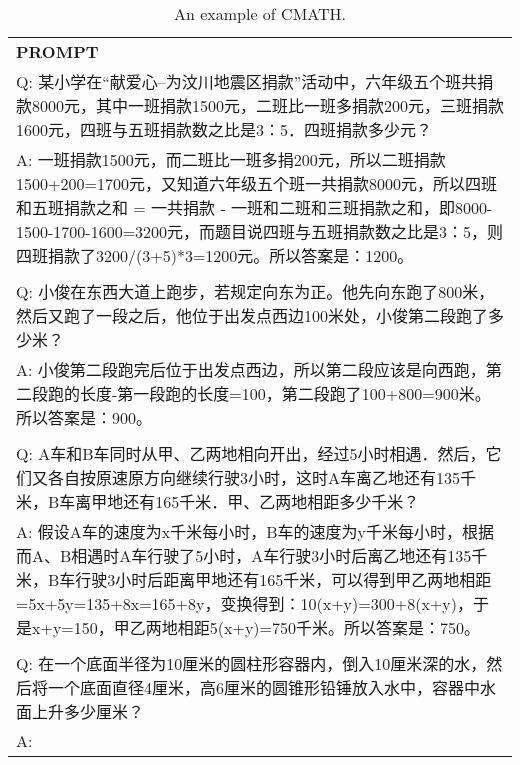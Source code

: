 \begin{table}[ht]
    \centering \small
\begin{tabular}{p{12cm}}
\toprule
\textbf{PROMPT}\\
Q: 某小学在“献爱心--为汶川地震区捐款”活动中，六年级五个班共捐款8000元，其中一班捐款1500元，二班比一班多捐款200元，三班捐款1600元，四班与五班捐款数之比是3：5．四班捐款多少元？
\\A: 一班捐款1500元，而二班比一班多捐200元，所以二班捐款1500+200=1700元，又知道六年级五个班一共捐款8000元，所以四班和五班捐款之和 = 一共捐款 - 一班和二班和三班捐款之和，即8000-1500-1700-1600=3200元，而题目说四班与五班捐款数之比是3：5，则四班捐款了3200/(3+5)*3=1200元。所以答案是：1200。
\\
\\Q: 小俊在东西大道上跑步，若规定向东为正。他先向东跑了800米，然后又跑了一段之后，他位于出发点西边100米处，小俊第二段跑了多少米？
\\A: 小俊第二段跑完后位于出发点西边，所以第二段应该是向西跑，第二段跑的长度-第一段跑的长度=100，第二段跑了100+800=900米。所以答案是：900。
\\
\\Q: A车和B车同时从甲、乙两地相向开出，经过5小时相遇．然后，它们又各自按原速原方向继续行驶3小时，这时A车离乙地还有135千米，B车离甲地还有165千米．甲、乙两地相距多少千米？
\\A: 假设A车的速度为x千米每小时，B车的速度为y千米每小时，根据而A、B相遇时A车行驶了5小时，A车行驶3小时后离乙地还有135千米，B车行驶3小时后距离甲地还有165千米，可以得到甲乙两地相距=5x+5y=135+8x=165+8y，变换得到：10(x+y)=300+8(x+y)，于是x+y=150，甲乙两地相距5(x+y)=750千米。所以答案是：750。
\\
\\Q: 在一个底面半径为10厘米的圆柱形容器内，倒入10厘米深的水，然后将一个底面直径4厘米，高6厘米的圆锥形铅锤放入水中，容器中水面上升多少厘米？
\\A:\\
\bottomrule
\end{tabular}
    \caption{\centering An example of CMATH.}
    \label{tab:cmath_eval_format_example}
\end{table}

